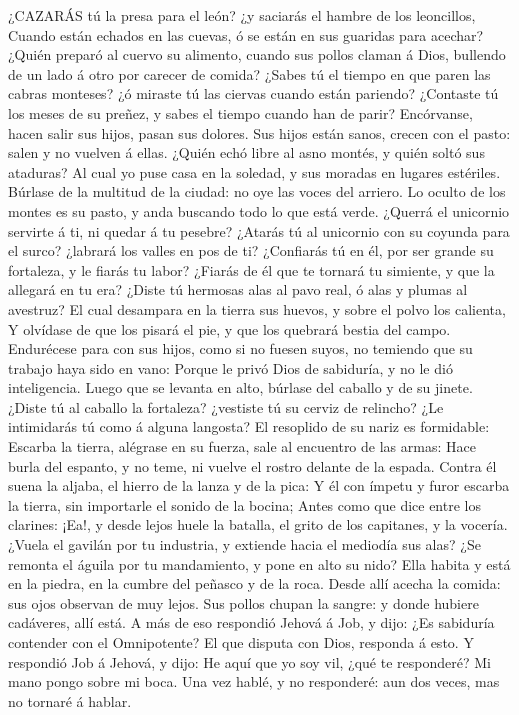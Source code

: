  ¿CAZARÁS tú la presa para el león? ¿y saciarás el hambre de
los leoncillos,  Cuando están echados en las cuevas, ó se
están en sus guaridas para acechar?  ¿Quién preparó al
cuervo su alimento, cuando sus pollos claman á Dios, bullendo de un lado
á otro por carecer de comida?  ¿Sabes tú el tiempo en que
paren las cabras monteses? ¿ó miraste tú las ciervas cuando están
pariendo?  ¿Contaste tú los meses de su preñez, y sabes el
tiempo cuando han de parir?  Encórvanse, hacen salir sus
hijos, pasan sus dolores.  Sus hijos están sanos, crecen con
el pasto: salen y no vuelven á ellas.  ¿Quién echó libre al
asno montés, y quién soltó sus ataduras?  Al cual yo puse
casa en la soledad, y sus moradas en lugares estériles. 
Búrlase de la multitud de la ciudad: no oye las voces del arriero.
 Lo oculto de los montes es su pasto, y anda buscando todo
lo que está verde.  ¿Querrá el unicornio servirte á ti, ni
quedar á tu pesebre?  ¿Atarás tú al unicornio con su
coyunda para el surco? ¿labrará los valles en pos de ti? 
¿Confiarás tú en él, por ser grande su fortaleza, y le fiarás tu labor?
 ¿Fiarás de él que te tornará tu simiente, y que la
allegará en tu era?  ¿Diste tú hermosas alas al pavo real,
ó alas y plumas al avestruz?  El cual desampara en la
tierra sus huevos, y sobre el polvo los calienta,  Y
olvídase de que los pisará el pie, y que los quebrará bestia del campo.
 Endurécese para con sus hijos, como si no fuesen suyos, no
temiendo que su trabajo haya sido en vano:  Porque le privó
Dios de sabiduría, y no le dió inteligencia.  Luego que se
levanta en alto, búrlase del caballo y de su jinete. 
¿Diste tú al caballo la fortaleza? ¿vestiste tú su cerviz de relincho?
 ¿Le intimidarás tú como á alguna langosta? El resoplido de
su nariz es formidable:  Escarba la tierra, alégrase en su
fuerza, sale al encuentro de las armas:  Hace burla del
espanto, y no teme, ni vuelve el rostro delante de la espada.
 Contra él suena la aljaba, el hierro de la lanza y de la
pica:  Y él con ímpetu y furor escarba la tierra, sin
importarle el sonido de la bocina;  Antes como que dice
entre los clarines: ¡Ea!, y desde lejos huele la batalla, el grito de
los capitanes, y la vocería.  ¿Vuela el gavilán por tu
industria, y extiende hacia el mediodía sus alas?  ¿Se
remonta el águila por tu mandamiento, y pone en alto su nido? Ella
habita y está en la piedra, en la cumbre del peñasco y de la roca. Desde
allí acecha la comida: sus ojos observan de muy lejos. Sus pollos chupan
la sangre: y donde hubiere cadáveres, allí está. A más de eso respondió
Jehová á Job, y dijo: ¿Es sabiduría contender con el Omnipotente? El que
disputa con Dios, responda á esto. Y respondió Job á Jehová, y dijo: He
aquí que yo soy vil, ¿qué te responderé? Mi mano pongo sobre mi boca.
Una vez hablé, y no responderé: aun dos veces, mas no tornaré á hablar.

